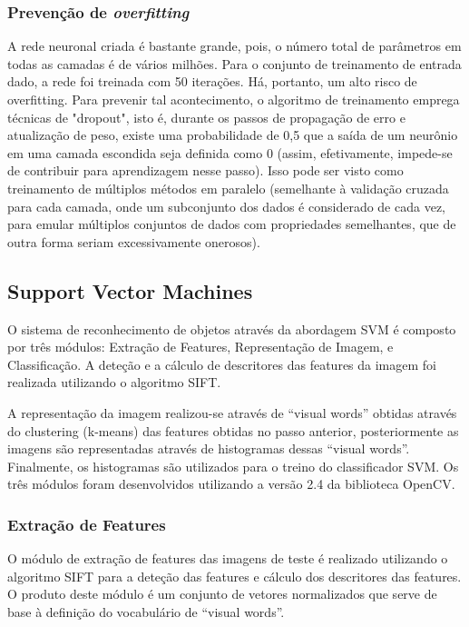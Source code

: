 \documentclass[extendedabs]{vcom}
\begin{document}
\subsubsection{Prevenção de \textit{overfitting}}
A rede neuronal criada é bastante grande, pois, o número total de parâmetros em todas as camadas é de vários milhões. Para o conjunto de treinamento de entrada dado, a rede foi treinada com 50 iterações. Há, portanto, um alto risco de overfitting. Para prevenir tal acontecimento, o algoritmo de treinamento emprega técnicas de "dropout", isto é, durante os passos de propagação de erro e atualização de peso, existe uma probabilidade de 0,5 que a saída de um neurônio em uma camada escondida seja definida como 0 (assim, efetivamente, impede-se de contribuir para aprendizagem nesse passo). Isso pode ser visto como treinamento de múltiplos métodos em paralelo (semelhante à validação cruzada para cada camada, onde um subconjunto dos dados é considerado de cada vez, para emular múltiplos conjuntos de dados com propriedades semelhantes, que de outra forma seriam excessivamente onerosos).

\subsection{Support Vector Machines}
O sistema de reconhecimento de objetos através da abordagem SVM é composto por três módulos: Extração de Features, Representação de Imagem, e Classificação. A deteção e a cálculo de descritores das features da imagem foi realizada utilizando o algoritmo SIFT. 

A representação da imagem realizou-se através de “visual words” obtidas através do clustering (k-means) das features obtidas no passo anterior, posteriormente as imagens são representadas através de histogramas dessas “visual words”. Finalmente, os histogramas são utilizados para o treino do classificador SVM. Os três módulos foram desenvolvidos utilizando a versão 2.4 da biblioteca OpenCV.

\subsubsection{Extração de Features}
O módulo de extração de features das imagens de teste é realizado utilizando o algoritmo SIFT para a deteção das features e cálculo dos descritores das features. O produto deste módulo é um conjunto de vetores normalizados que serve de base à definição do vocabulário de “visual words”.
\end{document}
